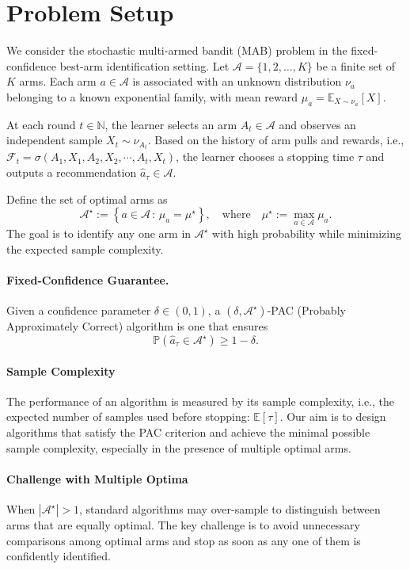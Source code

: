 \documentclass[final]{IEEEtran}
\newcommand{\calA}{\mathcal{A}}
\newcommand{\calF}{\mathcal{F}}
\begin{document}
\section{Problem Setup}

We consider the stochastic multi-armed bandit (MAB) problem in the fixed-confidence best-arm identification setting. Let $\calA = \{1, 2, \dots, K\}$ be a finite set of $K$ arms. Each arm $a \in \mathcal{A}$ is associated with an unknown distribution $\nu_a$ belonging to a known exponential family, with mean reward $\mu_a = \mathbb{E}_{X \sim \nu_a}[X]$.

At each round $t \in \mathbb{N}$, the learner selects an arm $A_t \in \calA$ and observes an independent sample $X_t \sim \nu_{A_t}$. Based on the history of arm pulls and rewards, i.e., $\calF_t=\sigma(A_1,X_1,A_2,X_2,\cdots, A_t,X_t)$, the learner chooses a stopping time $\tau$ and outputs a recommendation $\hat{a}_\tau \in \mathcal{A}$.

Define the set of optimal arms as
\[
\mathcal{A}^\star := \left\{ a \in \mathcal{A} \,:\, \mu_a = \mu^\star \right\}, \quad \text{where} \quad \mu^\star := \max_{a \in \mathcal{A}} \mu_a.
\]
The goal is to identify any one arm in $\mathcal{A}^\star$ with high probability while minimizing the expected sample complexity.

\paragraph{Fixed-Confidence Guarantee.}
Given a confidence parameter $\delta \in (0,1)$, a $(\delta, \mathcal{A}^\star)$-PAC (Probably Approximately Correct) algorithm is one that ensures
\[
\mathbb{P}(\hat{a}_\tau \in \mathcal{A}^\star) \geq 1 - \delta.
\]

\paragraph{Sample Complexity}
The performance of an algorithm is measured by its sample complexity, i.e., the expected number of samples used before stopping:
$
\mathbb{E}[\tau].
$
Our aim is to design algorithms that satisfy the PAC criterion and achieve the minimal possible sample complexity, especially in the presence of multiple optimal arms.

\paragraph{Challenge with Multiple Optima}
When $|\mathcal{A}^\star| > 1$, standard algorithms may over-sample to distinguish between arms that are equally optimal. The key challenge is to avoid unnecessary comparisons among optimal arms and stop as soon as any one of them is confidently identified.
\end{document}
